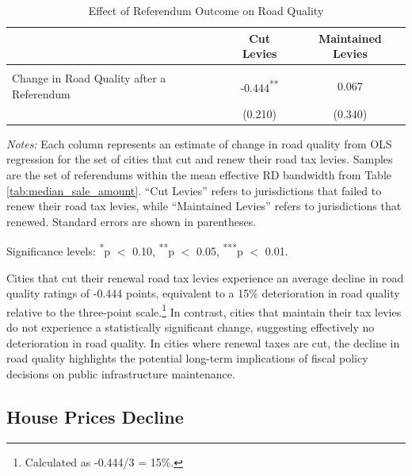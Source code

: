 \begin{table}[ht]
    \centering
    \caption{Effect of Referendum Outcome on Road Quality}
    \label{tab:roadquality_estimates}
    \begin{threeparttable}
    \begin{tabular}{lcc}
    \hline\hline
     & \textbf{Cut Levies} & \textbf{Maintained Levies} \\
    \hline
    \\[-0.3cm] %
    Change in Road Quality after a Referendum 
     & -0.444\textsuperscript{**} & 0.067 \\[0.2cm] %
     & (0.210) & (0.340) \\  
    \hline
    \end{tabular}
    \begin{tablenotes}
    \small
    \item \textit{Notes:} Each column represents an estimate of change in road quality from OLS regression for the set of cities that cut and renew their road tax levies. Samples are the set of referendums within the mean effective RD bandwidth from Table \ref{tab:median_sale_amount}. “Cut Levies” refers to jurisdictions that failed to renew their road tax levies, while “Maintained Levies” refers to jurisdictions that renewed. Standard errors are shown in parentheses. 
    
    \item Significance levels: 
    \textsuperscript{*}p $<$ 0.10,  
    \textsuperscript{**}p $<$ 0.05, 
    \textsuperscript{***}p $<$ 0.01.
    \end{tablenotes}
    \end{threeparttable}
\end{table}


Cities that cut their renewal road tax levies experience an average decline in road quality ratings of -0.444 points, equivalent to a 15\% deterioration in road quality relative to the three-point scale.\footnote{Calculated as -0.444/3 = 15\%.} In contrast, cities that maintain their tax levies do not experience a statistically significant change, suggesting effectively no deterioration in road quality. In cities where renewal taxes are cut, the decline in road quality highlights the potential long-term implications of fiscal policy decisions on public infrastructure maintenance.

\subsection{House Prices Decline}

